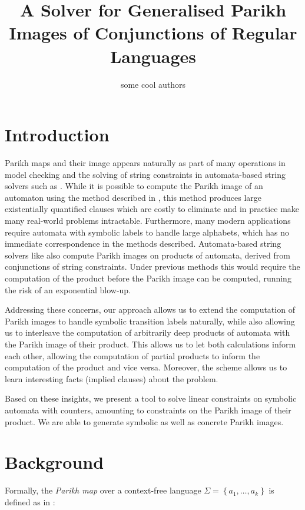 \documentclass[runningheads]{llncs}
\title{A Solver for Generalised Parikh Images of Conjunctions of Regular Languages}
\author{some cool authors}
\institute{Uppsala University, Sweden}
\begin{document}
\maketitle

\section{Introduction}

Parikh maps and their image appears naturally as part of many operations in
model checking and the solving of string constraints in automata-based string
solvers such as \Ostrich{} \cite{ostrich}. While it is possible to compute the Parikh image of
an automaton using the method described in \cite{generate-parikh-image}, this
method produces large existentially quantified clauses which are costly to
eliminate and in practice make many real-world problems intractable.
Furthermore, many modern applications require automata with symbolic labels to
handle large alphabets, which has no immediate correspondence in the methods described. Automata-based string solvers like \Ostrich{} also compute
Parikh images on products of automata, derived from conjunctions of string
constraints. Under previous methods this would require the computation of the
product before the Parikh image can be computed, running the risk of an
exponential blow-up.

Addressing these concerns, our approach allows us to extend the computation of
Parikh images to handle symbolic transition labels naturally, while also
allowing us to interleave the computation of arbitrarily deep products of
automata with the Parikh image of their product. This allows us to let both
calculations inform each other, allowing the computation of partial products to
inform the computation of the product and vice versa. Moreover, the scheme
allows us to learn interesting facts (implied clauses) about the problem.

Based on these insights, we present a tool to solve linear constraints on
symbolic automata with counters, amounting to constraints on the Parikh image of
their product. We are able to generate symbolic as well as concrete Parikh images.

\section{Background}

Formally, the \textit{Parikh map} over a context-free language $\Sigma = \left\{a_1, \ldots, a_k \right\}$ is defined as in \cite{kozen}:
\end{document}
